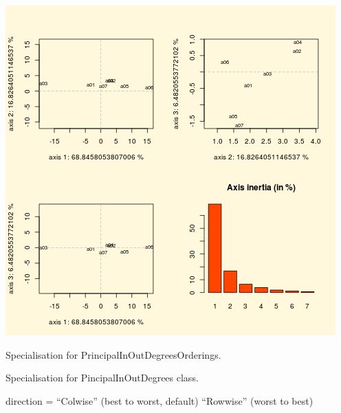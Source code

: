 \documentclass[letterpaper,10pt,english]{sphinxmanual}
\begin{document}
\begin{fulllineitems}
\includegraphics{proWeakOrdering_Colwise.png}

\begin{fulllineitems}
\label{techDoc:weakOrders.PrincipalInOutDegreesOrdering.computeWeakOrder}
Specialisation for PrincipalInOutDegreesOrderings.

\end{fulllineitems}


\begin{fulllineitems}
\label{techDoc:weakOrders.PrincipalInOutDegreesOrdering.exportGraphViz}
Specialisation for PincipalInOutDegrees class.

direction = ``Colwise'' (best to worst, default) \textbar{} ``Rowwise'' (worst to best)

\end{fulllineitems}



\end{fulllineitems}
\end{document}
